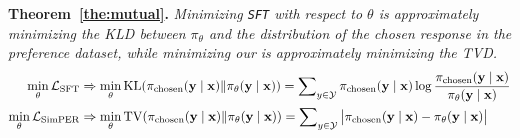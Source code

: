\textbf{Theorem~\ref{the:mutual}.} \textit{
Minimizing  \texttt{SFT}  with respect to ${\theta}$ is approximately minimizing the KLD between $\pi_\theta$ and the distribution of the chosen response in the preference dataset, while minimizing our \method  is approximately minimizing the TVD.}
\begingroup\makeatletter\def\f@size{9.5}\check@mathfonts\def\maketag@@@#1{\hbox{\m@th\normalfont\normalfont#1}}
\begin{align}
\min_{\theta} \mathcal{L}_{\rm{SFT}} &\Rightarrow  \min_{\theta}{\mathrm{KL}}(\pi_{\rm{chosen}}(\mathbf{y}\mid\mathbf{x})\|  \pi_\mathbf{\theta}(\mathbf{y} \mid \mathbf{x})  ) =\sum  \nolimits_{y\in \mathcal{Y}} \pi_{\rm{chosen}}(\mathbf{y} \mid \mathbf{x})\log \frac{\pi_{\rm{chosen}}(\mathbf{y} \mid \mathbf{x})}{\pi_{\theta}(\mathbf{y} \mid \mathbf{x})}\\
\min_{\theta} \mathcal{L}_{\rm{SimPER}} &\Rightarrow  \min_{\theta}{\mathrm{TV}}(\pi_{\rm{chosen}}(\mathbf{y}\mid\mathbf{x})\|  \pi_\mathbf{\theta}(\mathbf{y} \mid \mathbf{x})  ) =\sum\nolimits_{y\in \mathcal{Y}} \left| \pi_{\rm{chosen}}(\mathbf{y}\mid\mathbf{x}) -  \pi_\mathbf{\theta}(\mathbf{y} \mid \mathbf{x})  \right| 
\end{align}
\endgroup
